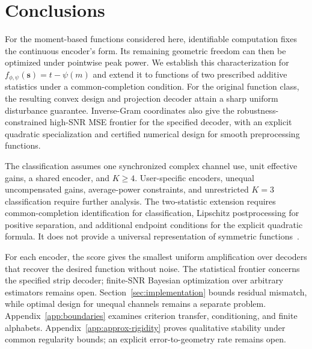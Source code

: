 \section{Conclusions}\label{sec:boundaries}
For the moment-based functions considered here, identifiable computation fixes the continuous encoder's form. Its remaining geometric freedom can then be optimized under pointwise peak power. We establish this characterization for $f_{\phi,\psi}(\mathbf s)=t-\psi(m)$ and extend it to functions of two prescribed additive statistics under a common-completion condition. For the original function class, the resulting convex design and projection decoder attain a sharp uniform disturbance guarantee. Inverse-Gram coordinates also give the robustness-constrained high-SNR MSE frontier for the specified decoder, with an explicit quadratic specialization and certified numerical design for smooth preprocessing functions.

The classification assumes one synchronized complex channel use, unit effective gains, a shared encoder, and $K\ge4$. User-specific encoders, unequal uncompensated gains, average-power constraints, and unrestricted $K=3$ classification require further analysis. The two-statistic extension requires common-completion identification for classification, Lipschitz postprocessing for positive separation, and additional endpoint conditions for the explicit quadratic formula. It does not provide a universal representation of symmetric functions~\cite{wagstaff19,wagstaff22}.

For each encoder, the score gives the smallest uniform amplification over decoders that recover the desired function without noise. The statistical frontier concerns the specified strip decoder; finite-SNR Bayesian optimization over arbitrary estimators remains open. Section~\ref{sec:implementation} bounds residual mismatch, while optimal design for unequal channels remains a separate problem.
\ifArxivVersion
Appendix~\ref{app:boundaries} examines criterion transfer, conditioning, and finite alphabets. Appendix~\ref{app:approx-rigidity} proves qualitative stability under common regularity bounds; an explicit error-to-geometry rate remains open.
\fi
